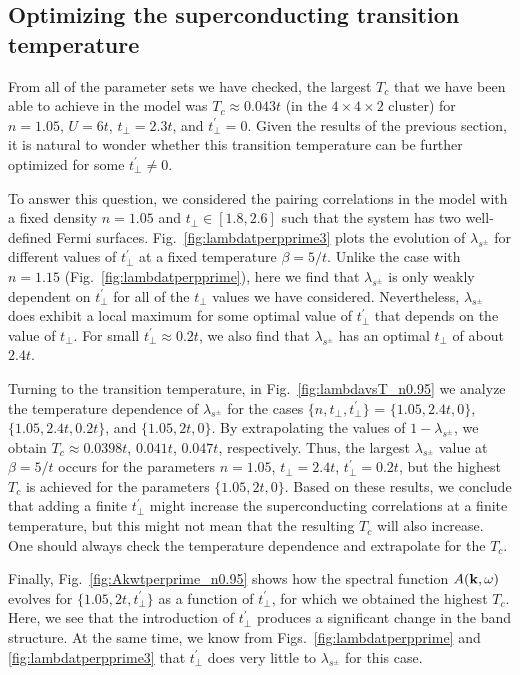 \documentclass[prb,twocolumn,amsmath,amssymb,superscriptaddress,floatfix,nofootinbib]{revtex4-2}
\begin{document}
\subsection{Optimizing the superconducting transition temperature} 
From all of the parameter sets we have checked, the largest $T_c$ that we have been able to achieve in the model was $T_c \approx 0.043t$ (in the $4\times 4\times 2$ cluster) for $n=1.05$, $U=6t$, $t_\perp = 2.3t$, and $t_\perp^\prime = 0$. Given the results of the previous section, it is natural to wonder whether this transition temperature can be further optimized for some $t_\perp^\prime \ne 0$. 

To answer this question, we considered the pairing correlations in the model with a fixed density $n=1.05$ and $t_\perp \in [1.8,2.6]$ such that the system has two well-defined Fermi surfaces. Fig.~\ref{fig:lambdatperpprime3} plots the  evolution of $\lambda_{s^\pm}$ for different values of $t_{\perp}^{\prime}$ at a fixed temperature $\beta= 5/t$. Unlike the case with $n=1.15$ (Fig.~\ref{fig:lambdatperpprime}), here we find that $\lambda_{s^\pm}$ is only weakly dependent on $t_{\perp}^{\prime}$ for all of the $t_{\perp}$ values we have considered. 
Nevertheless, $\lambda_{s^\pm}$ does exhibit a local maximum for some optimal value of $t_\perp^\prime$ that depends on the value of $t_\perp$. For small $t_\perp^\prime \approx 0.2t$, we also find that $\lambda_{s^\pm}$ has an optimal $t_{\perp}$ of about $2.4t$. 

Turning to the transition temperature, in Fig.~\ref{fig:lambdavsT_n0.95} we analyze the temperature dependence of $\lambda_{s^\pm}$ for the cases $\{n, t^{\phantom\prime}_\perp, t^\prime_\perp\}$  = $\{1.05,2.4t,0\}$, $\{1.05,2.4t,0.2t\}$, and $\{1.05,2t,0\}$. 
By extrapolating the values of $1-\lambda_{s^\pm}$, we obtain $T_c \approx 0.0398t$,  $0.041t$, $0.047t$, respectively. Thus, the largest $\lambda_{s^\pm}$ value at $\beta = 5/t$ occurs for the parameters $n=1.05$, $t_\perp = 2.4t$, $t_\perp^\prime=0.2t$, but the highest $T_c$ is achieved for the parameters $\{1.05,2t,0\}$. Based on these results, we conclude that adding a finite $t_{\perp}^{\prime}$ might increase the superconducting correlations at a finite temperature, but this might not mean that the resulting $T_c$ will also increase. One should always check the temperature dependence and extrapolate for the $T_c$.

Finally, Fig.~\ref{fig:Akwtperprime_n0.95} shows how the spectral function $A({\bf k},\omega)$ evolves for $\{1.05,2t,t^\prime_\perp\}$ as a function of $t_\perp^\prime$, for which we obtained the highest $T_c$. Here, we see that the introduction of $t_\perp^\prime$ produces a significant change in the band structure. At the same time, we know from Figs.~\ref{fig:lambdatperpprime} and \ref{fig:lambdatperpprime3} that $t_{\perp}^{\prime}$ does very little to $\lambda_{s^\pm}$ for this case. 
 
\end{document}
